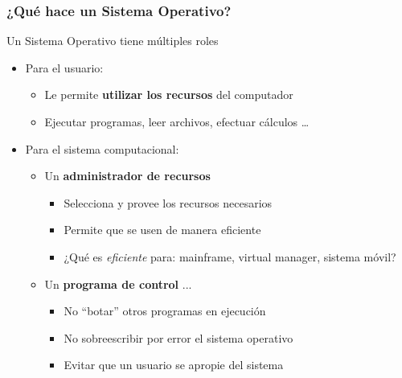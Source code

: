 \documentclass[letter]{beamer}
\begin{document}
\begin{frame}
  \frametitle{¿Qué hace un Sistema Operativo?}

  Un Sistema Operativo tiene múltiples roles

  \begin{itemize}
    \item<2-> Para el usuario:
      \begin{itemize}
        \item<3-> Le permite {\bf utilizar los recursos} del computador
        \item<4-> Ejecutar programas, leer archivos, efectuar cálculos \ldots {}
      \end{itemize}
    \item<6-> Para el sistema computacional:
      \begin{itemize}
        \item<7-> Un {\bf administrador de recursos} 
          \begin{itemize}
            \item<8-> Selecciona y provee los recursos necesarios
            \item<8-> Permite que se usen de manera eficiente
            \item<9-> ¿Qué es {\em eficiente} para: mainframe, virtual manager, sistema móvil?
          \end{itemize}
        \item<10-> Un {\bf programa de control} ... 
          \begin{itemize}
            \item<12-> No ``botar'' otros programas en ejecución
            \item<12-> No sobreescribir por error el sistema operativo
            \item<12-> Evitar que un usuario se apropie del sistema
          \end{itemize}
      \end{itemize}
  \end{itemize}

\end{frame}
\end{document}
